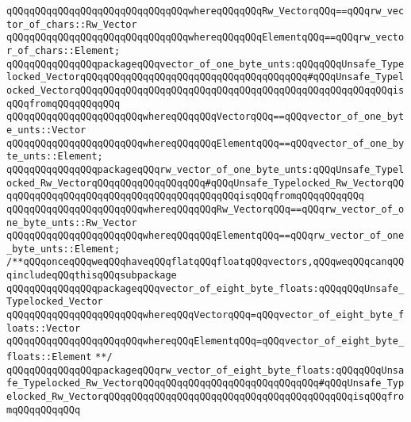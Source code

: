 \verb|qQQqqQQqqQQqqQQqqQQqqQQqqQQqqQQqwhereqQQqqQQqRw_VectorqQQq==qQQqrw_vector_of_chars::Rw_Vector|\newline
\verb|qQQqqQQqqQQqqQQqqQQqqQQqqQQqqQQqwhereqQQqqQQqElementqQQq==qQQqrw_vector_of_chars::Element;|\newline
\newline
\verb|qQQqqQQqqQQqqQQqpackageqQQqvector_of_one_byte_unts:qQQqqQQqUnsafe_Typelocked_VectorqQQqqQQqqQQqqQQqqQQqqQQqqQQqqQQqqQQqqQQq#qQQqUnsafe_Typelocked_VectorqQQqqQQqqQQqqQQqqQQqqQQqqQQqqQQqqQQqqQQqqQQqqQQqqQQqqQQqisqQQqfromqQQqqQQqqQQq|\newline
\verb|qQQqqQQqqQQqqQQqqQQqqQQqwhereqQQqqQQqVectorqQQq==qQQqvector_of_one_byte_unts::Vector|\newline
\verb|qQQqqQQqqQQqqQQqqQQqqQQqwhereqQQqqQQqElementqQQq==qQQqvector_of_one_byte_unts::Element;|\newline
\newline
\verb|qQQqqQQqqQQqqQQqpackageqQQqrw_vector_of_one_byte_unts:qQQqUnsafe_Typelocked_Rw_VectorqQQqqQQqqQQqqQQqqQQq#qQQqUnsafe_Typelocked_Rw_VectorqQQqqQQqqQQqqQQqqQQqqQQqqQQqqQQqqQQqqQQqqQQqisqQQqfromqQQqqQQqqQQq|\newline
\verb|qQQqqQQqqQQqqQQqqQQqqQQqwhereqQQqqQQqRw_VectorqQQq==qQQqrw_vector_of_one_byte_unts::Rw_Vector|\newline
\verb|qQQqqQQqqQQqqQQqqQQqqQQqwhereqQQqqQQqElementqQQq==qQQqrw_vector_of_one_byte_unts::Element;|\newline
\newline
\newline
\verb|/**qQQqonceqQQqweqQQqhaveqQQqflatqQQqfloatqQQqvectors,qQQqweqQQqcanqQQqincludeqQQqthisqQQqsubpackage|\newline
\verb|qQQqqQQqqQQqqQQqpackageqQQqvector_of_eight_byte_floats:qQQqqQQqUnsafe_Typelocked_Vector|\newline
\verb|qQQqqQQqqQQqqQQqqQQqqQQqwhereqQQqVectorqQQq=qQQqvector_of_eight_byte_floats::Vector|\newline
\verb|qQQqqQQqqQQqqQQqqQQqqQQqwhereqQQqElementqQQq=qQQqvector_of_eight_byte_floats::Element|\newline
\verb|**/|\newline
\verb|qQQqqQQqqQQqqQQqpackageqQQqrw_vector_of_eight_byte_floats:qQQqqQQqUnsafe_Typelocked_Rw_VectorqQQqqQQqqQQqqQQqqQQqqQQqqQQqqQQq#qQQqUnsafe_Typelocked_Rw_VectorqQQqqQQqqQQqqQQqqQQqqQQqqQQqqQQqqQQqqQQqqQQqisqQQqfromqQQqqQQqqQQq|\newline
